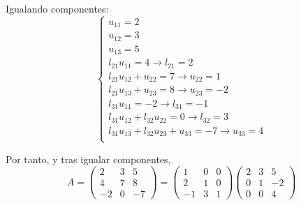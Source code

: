 \begin{ejercicio*}
    Igualando componentes:
    \begin{equation*}
    \left\{ \begin{array}{l}
         u_{11} = 2 \\ 
         u_{12} = 3 \\
         u_{13} = 5 \\
         l_{21}u_{11} = 4 \longrightarrow l_{21}=2 \\
         l_{21}u_{12} + u_{22} = 7 \longrightarrow u_{22}=1\\
         l_{21}u_{13} + u_{23} = 8 \longrightarrow u_{23}=-2 \\
         l_{31}u_{11} = -2 \longrightarrow l_{31}=-1 \\
         l_{31}u_{12} + l_{32}u_{22} = 0 \longrightarrow l_{32}=3 \\
         l_{31}u_{13} + l_{32}u_{23} + u_{33} = -7 \longrightarrow u_{33}=4\\
    \end{array}\right.
    \end{equation*}

    Por tanto, y tras igualar componentes,
    \begin{equation*}
        A = \left(
        \begin{array}{ccc}
            2 & 3 & 5 \\
            4 & 7 & 8 \\
            -2 & 0 & -7
        \end{array}\right)
        = \left(
        \begin{array}{ccc}
            1 & 0 & 0 \\
            2 & 1 & 0 \\
            -1 & 3 & 1
        \end{array}\right) \left(
        \begin{array}{ccc}
            2 & 3 & 5 \\
            0 & 1 & -2 \\
            0 & 0 & 4
        \end{array}\right)
    \end{equation*}
\end{ejercicio*}

